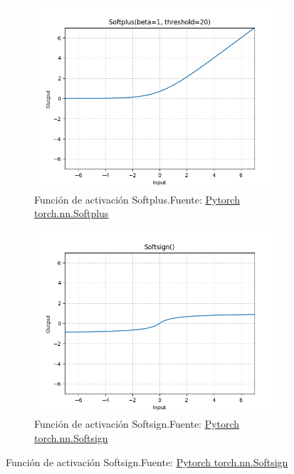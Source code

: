 \begin{figure}[H]
  \medskip %
  \begin{subfigure}{.475\linewidth}
    \centering
    \includegraphics[width=0.75\linewidth]{figures/equations/Softplus.png}
    \caption{Función de activación Softplus.\newline{}Fuente: \href{https://pytorch.org/docs/stable/generated/torch.nn.Softplus.html}{Pytorch torch.nn.Softplus}}
    \label{subfig:torch.nn.Softplus}
  \end{subfigure}\hfill %
  \begin{subfigure}{.475\linewidth}
    \centering
    \includegraphics[width=0.75\linewidth]{figures/equations/Softsign.png}
    \caption{Función de activación Softsign.\newline{}Fuente: \href{https://pytorch.org/docs/stable/generated/torch.nn.Softsign.html}{Pytorch torch.nn.Softsign}}
    \label{subfig:torch.nn.Softsign}
  \end{subfigure}


\end{figure}
